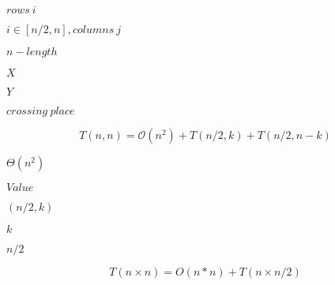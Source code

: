 \documentclass[10pt]{book}
\begin{document}
\begin{mdSnippets}
\begin{mdInlineSnippet}[a0dd9fa3ddd67fb3335b78084fe8d342]
$rows~i$\end{mdInlineSnippet}%
\begin{mdInlineSnippet}[9bfa807e52e07560b74a851a5be5e4e8]%
$i \in [n/2, n],  columns~j$\end{mdInlineSnippet}%
\begin{mdInlineSnippet}[457741f3774e60e70148d95a9fd51c83]%
$n - length$\end{mdInlineSnippet}%
\begin{mdInlineSnippet}[02129bb861061d1a052c592e2dc6b383]%
$X$\end{mdInlineSnippet}%
\begin{mdInlineSnippet}[57cec4137b614c87cb4e24a3d003a3e0]%
$Y$\end{mdInlineSnippet}%
\begin{mdInlineSnippet}[8e69acc373088bb0a6c744e140f2496c]%
$crossing~place$\end{mdInlineSnippet}%
\begin{mdDisplaySnippet}[666ed2e62ee42d2bec6e765963155d9e]%
\[%
  T(n, n) = \mathcal{O}(n ^ 2) + T(n/2,k) + T(n/2,n-k) 
\]%
\end{mdDisplaySnippet}%
\begin{mdInlineSnippet}%
$\Theta(n^2)$\end{mdInlineSnippet}%
\begin{mdInlineSnippet}[689202409e48743b914713f96d93947c]%
$Value$\end{mdInlineSnippet}%
\begin{mdInlineSnippet}[1ce6ca41f34aa81d26a70df5cc6555bd]%
$(n/2,k)$\end{mdInlineSnippet}%
\begin{mdInlineSnippet}[8ce4b16b22b58894aa86c421e8759df3]%
$k$\end{mdInlineSnippet}%
\begin{mdInlineSnippet}%
$n/2$\end{mdInlineSnippet}%
\begin{mdDisplaySnippet}%
\[%
T(n \times n) = O(n*n) + T(n \times n/2)
\]%
\end{mdDisplaySnippet}%

\end{mdSnippets}
\end{document}
